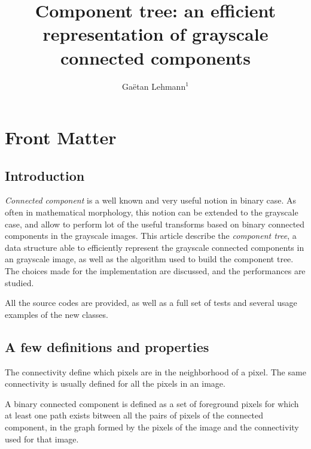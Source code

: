 \documentclass{InsightArticle}
\title{Component tree: an efficient representation of grayscale connected components}
\author{Ga\"etan Lehmann{$^1$}}
\begin{document}
\maketitle

\ifhtml
\chapter*{Front Matter\label{front}}
\fi


\begin{abstract}
\noindent
\end{abstract}

\tableofcontents

\section{Introduction}

{\em Connected component} is a well known and very useful notion in binary case.
As often in mathematical morphology, this notion can be extended to the grayscale case,
and allow to perform lot of the useful transforms based on binary connected components
in the grayscale images.
This article describe the {\em component tree}, a data structure able to efficiently represent
the grayscale connected components in an grayscale image, as well as the algorithm
used to build the component tree.
The choices made for the implementation are discussed, and the performances are studied.

All the source codes are provided, as well as a full set of tests and several
usage examples of the new classes.

\section{A few definitions and properties}

The connectivity define which pixels are in the neighborhood of a pixel. The same connectivity is usually defined for all the pixels in an image.

A binary connected component is defined as a set of foreground pixels for which at least one path
exists bitween all the pairs of pixels of the connected component, in the graph formed by
the pixels of the image and the connectivity used for that image.
\end{document}
